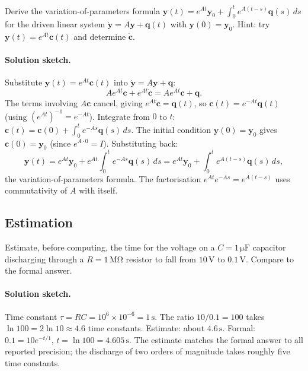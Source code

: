 \begin{exercise}
Derive the variation-of-parameters formula
$\mathbf{y}(t) = e^{A t}\mathbf{y}_{0} + \int_{0}^{t} e^{A(t -
s)}\mathbf{q}(s)\,ds$ for the driven linear system
$\dot{\mathbf{y}} = A\mathbf{y} + \mathbf{q}(t)$ with
$\mathbf{y}(0) = \mathbf{y}_{0}$. Hint: try $\mathbf{y}(t) = e^{A
t}\mathbf{c}(t)$ and determine $\dot{\mathbf{c}}$.

\paragraph{Solution sketch.} Substitute $\mathbf{y}(t) = e^{A t}
\mathbf{c}(t)$ into $\dot{\mathbf{y}} = A \mathbf{y} + \mathbf{q}$:
\[
A e^{A t} \mathbf{c} + e^{A t} \dot{\mathbf{c}} = A e^{A t}
\mathbf{c} + \mathbf{q}.
\]
The terms involving $A \mathbf{c}$ cancel, giving $e^{A t}
\dot{\mathbf{c}} = \mathbf{q}(t)$, so $\dot{\mathbf{c}}(t) = e^{-A
t} \mathbf{q}(t)$ (using $(e^{A t})^{-1} = e^{-A t}$). Integrate
from $0$ to $t$: $\mathbf{c}(t) = \mathbf{c}(0) + \int_{0}^{t}
e^{-A s} \mathbf{q}(s) \, ds$. The initial condition $\mathbf{y}(0)
= \mathbf{y}_{0}$ gives $\mathbf{c}(0) = \mathbf{y}_{0}$
(since $e^{A \cdot 0} = I$). Substituting back:
\[
\mathbf{y}(t) = e^{A t} \mathbf{y}_{0} + e^{A t} \int_{0}^{t}
e^{-A s} \mathbf{q}(s) \, ds = e^{A t} \mathbf{y}_{0} +
\int_{0}^{t} e^{A (t - s)} \mathbf{q}(s) \, ds,
\]
the variation-of-parameters formula. The factorisation $e^{A t}
e^{-A s} = e^{A (t - s)}$ uses commutativity of $A$ with itself.
\end{exercise}

\subsection*{Estimation}

\begin{exercise}
Estimate, before computing, the time for the voltage on a $C =
1\,\si{\micro\farad}$ capacitor discharging through a $R =
1\,\si{\mega\ohm}$ resistor to fall from $10\,\si{\volt}$ to
$0.1\,\si{\volt}$. Compare to the formal answer.

\paragraph{Solution sketch.} Time constant $\tau = RC = 10^{6}
\times 10^{-6} = 1\,\si{\second}$. The ratio $10/0.1 = 100$ takes
$\ln 100 = 2 \ln 10 \approx 4.6$ time constants. Estimate: about
$4.6\,\si{\second}$. Formal: $0.1 = 10 e^{-t/1}$, $t = \ln 100
= 4.605\,\si{\second}$. The estimate matches the formal answer to
all reported precision; the discharge of two orders of magnitude
takes roughly five time constants.
\end{exercise}

